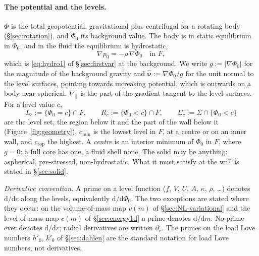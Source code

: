 \documentclass[11pt]{article}
\theoremstyle{definition}
\theoremstyle{remark}
\newcommand{\nuh}{\hat{\boldsymbol{\nu}}}
\begin{document}
\paragraph{The potential and the levels.} $\Phi$ is the total
geopotential, gravitational plus centrifugal for a rotating body
(\S\ref{sec:rotation}), and $\Phi_0$ its background value. The body is
in static equilibrium in $\Phi_0$, and in the fluid the equilibrium is
hydrostatic,
\begin{equation}
  \nabla p_0 = -\rho\,\nabla\Phi_0 \quad\text{in } F ,
  \label{eq:hydro}
\end{equation}
which is \eqref{eq:hydro1} of \S\ref{sec:firstvar} at the background.
We write $g := |\nabla\Phi_0|$ for the magnitude of the background
gravity and $\nuh := \nabla\Phi_0/g$ for the unit normal to the level
surfaces, pointing towards increasing potential, which is outwards on
a body near spherical. $\nabla_{\!\parallel}$ is the part of the
gradient tangent to the level surfaces. For a level value $c$,
\begin{equation*}
  L_c := \{\Phi_0 = c\}\cap F,
  \qquad
  R_c := \{\Phi_0 < c\}\cap F,
  \qquad
  \Sigma_c := \Sigma\cap\{\Phi_0 < c\}
\end{equation*}
are the level set, the region below it and the part of the wall below
it (Figure~\ref{fig:geometry}). $c_{\min}$ is the lowest level in $F$,
at a centre or on an inner wall, and $c_{\mathrm{top}}$ the highest. A
\emph{centre} is an interior minimum of $\Phi_0$ in $F$, where $g =
0$: a full core has one, a fluid shell none. The solid may be
anything: aspherical, pre-stressed, non-hydrostatic. What it must
satisfy at the wall is stated in \S\ref{sec:solid}.

\emph{Derivative convention.} A prime on a level function ($f$, $V$,
$U$, $A$, $\kappa$, $\rho$, \dots) denotes $\mathrm d/\mathrm dc$ along
the levels, equivalently $\mathrm d/\mathrm d\Phi_0$. The two
exceptions are stated where they occur: on the volume-of-mass map
$v(m)$ of \S\ref{sec:NL-variational} and the level-of-mass map $c(m)$
of \S\ref{sec:energy1d} a prime denotes $\mathrm d/\mathrm dm$. No
prime ever denotes $\mathrm d/\mathrm dr$; radial derivatives are
written $\partial_r$. The primes on the load Love numbers $h'_0$,
$k'_0$ of \S\ref{sec:dahlen} are the standard notation for load Love
numbers, not derivatives.
\end{document}
